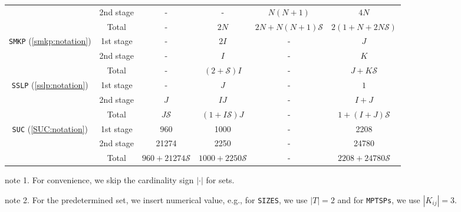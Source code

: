 \begin{table}[H]
{\begin{threeparttable}
\begin{tabular}{@{}cccccc@{}}
				& 2nd stage & -              & -                                  & $N(N+1)$              & $4N$                     \\ \cmidrule(l){2-6} 
				& Total          & -              & $2N$                               & $2N+N(N+1)\mathcal{S}$ & $2(1+N+2N\mathcal{S})$    \\ \midrule
				\multirow{3}{*}{\texttt{SMKP} (\ref{smkp:notation})}   & 1st stage & -              & $2I$                               & -                    & $J$                       \\
				& 2nd stage & -              & $I$                                & -                    & $K$                       \\ \cmidrule(l){2-6} 
				& Total          & -              & $(2+\mathcal{S})I$                 & -                    & $J+K\mathcal{S}$          \\ \midrule
				\multirow{3}{*}{\texttt{SSLP} (\ref{sslp:notation})}   & 1st stage & -              & $J$                                & -                    & $1$                       \\
				& 2nd stage & $J$            & $IJ$                               & -                    & $I+J$                     \\ \cmidrule(l){2-6} 
				& Total          & $J\mathcal{S}$ & $(1+I\mathcal{S})J$                & -                    & $1+(I+J)\mathcal{S}$      \\ \midrule
				\multirow{3}{*}{\texttt{SUC} (\ref{SUC:notation})}   & 1st stage & 960               &   1000                                 &     -                 &  2208                         \\
				& 2nd stage & 21274               &     2250                               &   -                   & 24780                          \\ \cmidrule(l){2-6} 
				& Total          & $960+21274\mathcal{S}$                &  $1000+2250\mathcal{S}$                                  &  -                    &  $2208+24780\mathcal{S}$                         \\ \bottomrule
			\end{tabular}
			
			\begin{tablenotes}
				\small
				\item note 1. For convenience, we skip the cardinality sign $|\cdot|$ for sets.
				\item note 2. For the predetermined set, we insert numerical value, e.g., for \texttt{SIZES}, we use $|T|=2$ and for \texttt{MPTSPs}, we use $|K_{ij}|=3$.
			\end{tablenotes}
		\end{threeparttable}
	}
\end{table}

